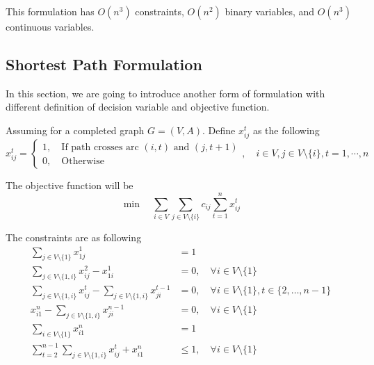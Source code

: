 					This formulation has $O(n^3)$ constraints, $O(n^2)$ binary variables, and $O(n^3)$ continuous variables.

				\subsection{Shortest Path Formulation}

					In this section, we are going to introduce another form of formulation with different definition of decision variable and objective function.

					Assuming for a completed graph $G = (V, A)$. Define $x_{ij}^t$ as the following
					\begin{equation}
						x_{ij}^t = \begin{cases}
										1, \quad \text{If path crosses arc } (i, t) \text{ and } (j, t + 1) \\
										0, \quad \text{Otherwise}
									\end{cases}, \quad i \in V, j \in V \setminus \{i\}, t = 1, \cdots, n
					\end{equation}

					The objective function will be
					\begin{equation}
						\min \quad \sum_{i \in V}\sum_{j \in V\setminus \{i\}} c_{ij} \sum_{t = 1}^n x_{ij}^t
					\end{equation}

					The constraints are as following
					\begin{align}
						\sum_{j \in V \setminus \{1\}} x_{1j}^1 &= 1 \label{TSP:con:SPFStart}\\
						\sum_{j \in V \setminus \{1, i\}} x_{ij}^2 - x_{1i}^1 &= 0, \quad \forall i \in V \setminus \{1\} \label{TSP:con:SPFFirstLayer}\\
						\sum_{j \in V \setminus \{1, i\}} x_{ij}^t - \sum_{j \in V \setminus \{1, i\}} x_{ji}^{t - 1} &= 0, \quad \forall i \in V \setminus \{1\}, t \in \{2, \dots, n - 1\} \label{TSP:con:SPFTthLayer}\\
						x_{i1}^n - \sum_{j \in V \setminus \{1, i\}} x_{ji}^{n - 1} &= 0, \quad \forall i \in V \setminus \{1\} \label{TSP:con:SPFLastLayer}\\
						\sum_{i \in V \setminus \{1\}} x_{i1}^n &= 1 \label{TSP:con:SPFEnd}\\
						\sum_{t = 2}^{n - 1}\sum_{j \in V \setminus \{1, i\}} x_{ij}^t + x_{i1}^n & \le 1, \quad \forall i \in V \setminus \{1\} \label{TSP:con:SPFSameType1}
					\end{align}

